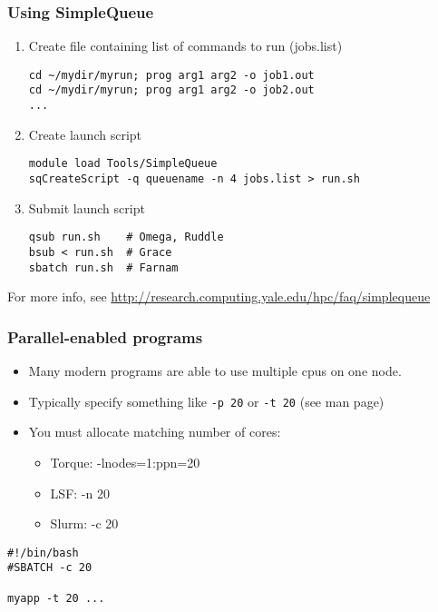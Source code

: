 \documentclass[10pt]{beamer}
\begin{document}
\begin{frame}[fragile]
\frametitle{Using SimpleQueue}

\begin{enumerate}
\item Create file containing list of commands to run (jobs.list)
\begin{verbatim}
cd ~/mydir/myrun; prog arg1 arg2 -o job1.out  
cd ~/mydir/myrun; prog arg1 arg2 -o job2.out  
...
\end{verbatim}
\item Create launch script
\begin{verbatim}
module load Tools/SimpleQueue
sqCreateScript -q queuename -n 4 jobs.list > run.sh
\end{verbatim}

\item Submit launch script
\begin{verbatim}
qsub run.sh    # Omega, Ruddle
bsub < run.sh  # Grace
sbatch run.sh  # Farnam
\end{verbatim}
\end{enumerate}

For more info, see \url{http://research.computing.yale.edu/hpc/faq/simplequeue}

\end{frame}

\begin{frame}[fragile]
\frametitle{Parallel-enabled programs}
\begin{itemize}
\item Many modern programs are able to use multiple cpus on one node.
\item Typically specify something like \verb+-p 20+ or \verb+-t 20+ (see man page)
\item You must allocate matching number of cores:
\begin{itemize}
\item Torque: -lnodes=1:ppn=20
\item LSF:    -n 20
\item Slurm:  -c 20
\end{itemize}
\end{itemize}

\begin{block}{}
\begin{verbatim}
#!/bin/bash
#SBATCH -c 20

myapp -t 20 ...
\end{verbatim}
\end{block}{}
\end{frame}
\end{document}
